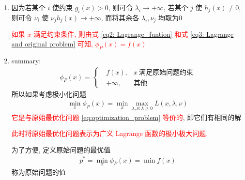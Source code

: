 \documentclass[oneside, 12pt]{ctexbook}
\begin{document}
\begin{enumerate}
					\item 因为若某个 $i$ 使约束 $g_i(x) > 0$, 则可令 $\lambda_i \rightarrow +\infty$, 若某个 $j$ 使 $h_j(x) \neq 0$, 则可令 $\nu_i$ 使 $\nu_j h_j(x) \rightarrow +\infty$, 而将其余各 $\lambda_i, \nu_j$ 均取为0
					
						\textcolor{red}{如果 $x$ 满足约束条件, 则由式 \ref{eq2: Lagrange_funtion} 和式 \ref{eq3: Lagrange and original problem} 可知, $\phi_P (x) = f(x)$}
					
					\item summary:
						\begin{align}
							\phi_P(x) = \left\{ 
								\begin{matrix}
									&f(x),     &x \ \text{满足原始问题约束} \\
									&+\infty,  &\text{其他}
								\end{matrix}
								\right.
						\end{align}
						所以如果考虑极小化问题
							\begin{align}
								\min\limits_x \phi_P(x) = \min\limits_x \max\limits_{\lambda, \nu : \lambda \geq 0} L(x, \lambda, \nu)
							\end{align}
						\textcolor{red}{它是与原始最优化问题 \ref{eq:optimization_problem} 等价的}, 即它们有相同的解
						
						\textcolor{red}{此时将原始最优化问题表示为广义 Lagrange 函数的极小极大问题.}
						
						为了方便, 定义原始问题的最优值
							\begin{align}
								p^* = \min\limits_x \phi_P (x) = \min f(x)
							\end{align}
						称为原始问题的值
				\end{enumerate}
			
\end{document}
